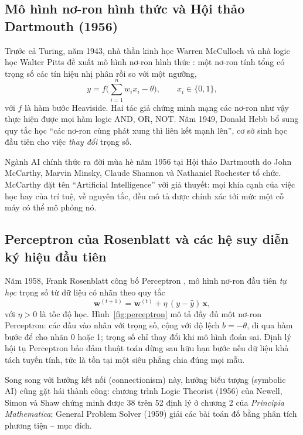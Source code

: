 \subsection{Mô hình nơ-ron hình thức và Hội thảo Dartmouth (1956)}

Trước cả Turing, năm 1943, nhà thần kinh học Warren McCulloch và nhà logic học Walter Pitts đề xuất mô hình
nơ-ron hình thức \cite{mcculloch1943}: một nơ-ron tính tổng có trọng số các tín hiệu nhị phân rồi so với một ngưỡng,
\begin{equation}
  y = f\Big(\sum_{i=1}^{n} w_i x_i - \theta\Big), \qquad x_i \in \{0, 1\},
  \label{eq:mcp}
\end{equation}
với $f$ là hàm bước Heaviside. Hai tác giả chứng minh mạng các nơ-ron như vậy thực hiện được mọi hàm logic AND, OR,
NOT. Năm 1949, Donald Hebb bổ sung quy tắc học “các nơ-ron cùng phát xung thì liên kết mạnh lên”, cơ sở sinh học đầu
tiên cho việc \emph{thay đổi} trọng số.

Ngành AI chính thức ra đời mùa hè năm 1956 tại Hội thảo Dartmouth do John McCarthy, Marvin Minsky, Claude Shannon và
Nathaniel Rochester tổ chức. McCarthy đặt tên “Artificial Intelligence” với giả thuyết: mọi khía cạnh của việc học hay
của trí tuệ, về nguyên tắc, đều mô tả được chính xác tới mức một cỗ máy có thể mô phỏng nó.

\subsection{Perceptron của Rosenblatt và các hệ suy diễn ký hiệu đầu tiên}

Năm 1958, Frank Rosenblatt công bố Perceptron \cite{rosenblatt1958}, mô hình nơ-ron đầu tiên \emph{tự học} trọng số
từ dữ liệu có nhãn theo quy tắc
\begin{equation}
  \mathbf{w}^{(t+1)} = \mathbf{w}^{(t)} + \eta\,(y - \hat y)\,\mathbf{x},
  \label{eq:perceptron}
\end{equation}
với $\eta > 0$ là tốc độ học. Hình~\ref{fig:perceptron} mô tả đầy đủ một nơ-ron Perceptron: các đầu vào nhân với trọng
số, cộng với độ lệch $b = -\theta$, đi qua hàm bước để cho nhãn 0 hoặc 1; trọng số chỉ thay đổi khi mô hình đoán sai.
Định lý hội tụ Perceptron bảo đảm thuật toán dừng sau hữu hạn bước nếu dữ liệu khả tách tuyến tính, tức là tồn tại
một siêu phẳng chia đúng mọi mẫu.

 Song song với hướng kết nối (connectionism) này, hướng biểu tượng (symbolic AI) cũng gặt hái thành
công: chương trình Logic Theorist (1956) của Newell, Simon và Shaw chứng minh được 38 trên 52 định lý ở chương 2 của
\emph{Principia Mathematica}; General Problem Solver (1959) giải các bài toán đố bằng phân tích phương tiện -- mục đích.

